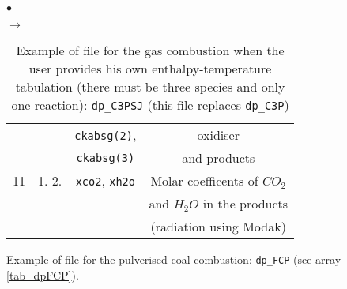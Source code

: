 {{{\begin{list}{$\bullet$}{}
\begin{list}{$\rightarrow$}{}
\begin{table}[htbp]
\begin{center}
{\begin{tabular}{|c|c|c|c|}
        &                                   &                  \texttt{ckabsg(2)}, & oxidiser                                    \\
        &                                   &                  \texttt{ckabsg(3)}  & and products                                \\ \hline
  11    &    1.       2.                    & \texttt{xco2\index{xco2}},   \texttt{xh2o\index{xh2o}}& Molar coefficents of $CO_2$         \\
        &                                   &                             & and $H_2O$ in the products                  \\
        &                                   &                             & (radiation using Modak)                     \\ \hline
\end{tabular}
}
\caption{Example of file for the gas combustion when the user provides
 his own enthalpy-temperature tabulation
                     (there must be three species and only one
                     reaction): \texttt{dp\_C3PSJ} (this file replaces
 \texttt{dp\_C3P})}\label{tab_dpC3PSJ}
\end{center}
\end{table}
        \end{list}

       \item Example of file for the pulverised coal combustion:
             \texttt{dp\_FCP} (see array \ref{tab_dpFCP}).


\end{list}}}}
